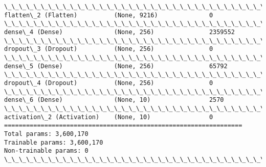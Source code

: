 \documentclass[11pt]{article}
\begin{document}
\begin{Verbatim}[commandchars=\\\{\}]
\_\_\_\_\_\_\_\_\_\_\_\_\_\_\_\_\_\_\_\_\_\_\_\_\_\_\_\_\_\_\_\_\_\_\_\_\_\_\_\_\_\_\_\_\_\_\_\_\_\_\_\_\_\_\_\_\_\_\_\_\_\_\_\_\_
flatten\_2 (Flatten)          (None, 9216)              0         
\_\_\_\_\_\_\_\_\_\_\_\_\_\_\_\_\_\_\_\_\_\_\_\_\_\_\_\_\_\_\_\_\_\_\_\_\_\_\_\_\_\_\_\_\_\_\_\_\_\_\_\_\_\_\_\_\_\_\_\_\_\_\_\_\_
dense\_4 (Dense)              (None, 256)               2359552   
\_\_\_\_\_\_\_\_\_\_\_\_\_\_\_\_\_\_\_\_\_\_\_\_\_\_\_\_\_\_\_\_\_\_\_\_\_\_\_\_\_\_\_\_\_\_\_\_\_\_\_\_\_\_\_\_\_\_\_\_\_\_\_\_\_
dropout\_3 (Dropout)          (None, 256)               0         
\_\_\_\_\_\_\_\_\_\_\_\_\_\_\_\_\_\_\_\_\_\_\_\_\_\_\_\_\_\_\_\_\_\_\_\_\_\_\_\_\_\_\_\_\_\_\_\_\_\_\_\_\_\_\_\_\_\_\_\_\_\_\_\_\_
dense\_5 (Dense)              (None, 256)               65792     
\_\_\_\_\_\_\_\_\_\_\_\_\_\_\_\_\_\_\_\_\_\_\_\_\_\_\_\_\_\_\_\_\_\_\_\_\_\_\_\_\_\_\_\_\_\_\_\_\_\_\_\_\_\_\_\_\_\_\_\_\_\_\_\_\_
dropout\_4 (Dropout)          (None, 256)               0         
\_\_\_\_\_\_\_\_\_\_\_\_\_\_\_\_\_\_\_\_\_\_\_\_\_\_\_\_\_\_\_\_\_\_\_\_\_\_\_\_\_\_\_\_\_\_\_\_\_\_\_\_\_\_\_\_\_\_\_\_\_\_\_\_\_
dense\_6 (Dense)              (None, 10)                2570      
\_\_\_\_\_\_\_\_\_\_\_\_\_\_\_\_\_\_\_\_\_\_\_\_\_\_\_\_\_\_\_\_\_\_\_\_\_\_\_\_\_\_\_\_\_\_\_\_\_\_\_\_\_\_\_\_\_\_\_\_\_\_\_\_\_
activation\_2 (Activation)    (None, 10)                0         
=================================================================
Total params: 3,600,170
Trainable params: 3,600,170
Non-trainable params: 0
\_\_\_\_\_\_\_\_\_\_\_\_\_\_\_\_\_\_\_\_\_\_\_\_\_\_\_\_\_\_\_\_\_\_\_\_\_\_\_\_\_\_\_\_\_\_\_\_\_\_\_\_\_\_\_\_\_\_\_\_\_\_\_\_\_

    \end{Verbatim}
\end{document}
